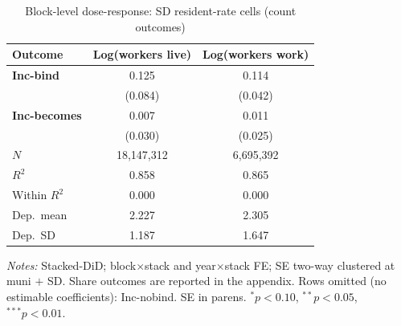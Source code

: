 \begin{table}[!htbp]
  \centering
  \caption{Block-level dose-response: SD resident-rate cells (count outcomes)}
  \label{tab:headline_block_sd_results}
  \footnotesize
  \renewcommand{\arraystretch}{0.9}
  \begin{tabular}{lcc}
    \toprule
    Outcome & Log(workers live) & Log(workers work) \\
    \midrule
    \textbf{Inc-bind} & 0.125 & 0.114\sym{***} \\
                      & (0.084) & (0.042) \\
    \textbf{Inc-becomes} & 0.007 & 0.011 \\
                      & (0.030) & (0.025) \\
    \midrule
    $N$ & 18,147,312 & 6,695,392 \\
    $R^2$ & 0.858 & 0.865 \\
    Within $R^2$ & 0.000 & 0.000 \\
    Dep.\ mean & 2.227 & 2.305 \\
    Dep.\ SD & 1.187 & 1.647 \\
    \bottomrule
  \end{tabular}
  \vspace{0.3em}
  \begin{minipage}{0.95\textwidth}
    \footnotesize \textit{Notes:} Stacked-DiD; block$\times$stack and year$\times$stack FE; SE two-way clustered at muni $+$ SD. Share outcomes are reported in the appendix. Rows omitted (no estimable coefficients): Inc-nobind. SE in parens. $^{*}p<0.10$, $^{**}p<0.05$, $^{***}p<0.01$.
  \end{minipage}
\end{table}
